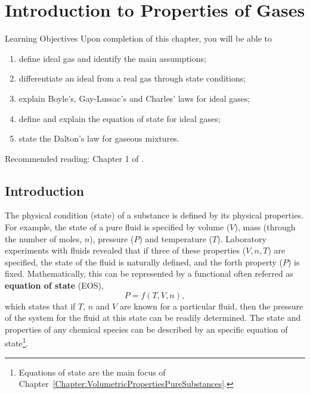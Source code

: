 
\chapter{Introduction to Properties of Gases}\label{Chapter:Intro_Property_of_Gases}

   \begin{LearningObjectivesBlock}{Learning Objectives}
      Upon completion of this chapter, you will be able to
        \begin{enumerate}
           \item define ideal gas and identify the main assumptions;
           \item differentiate an ideal from a real gas through state conditions;
           \item explain Boyle's, Gay-Lussac's and Charles' laws for ideal gases;
           \item define and explain the equation of state for ideal gases;
           \item state the Dalton's law for gaseous mixtures.
        \end{enumerate}
\medskip
     Recommended reading: Chapter 1 of \citet{Atkins_Book,Adamson_BookChapter}.
   \end{LearningObjectivesBlock}


\localtableofcontents
   
     \section{Introduction}\label{Chapter:Intro_Property_of_Gases:Section:Intro}

   The physical condition (\ie state) of a substance is defined by its physical properties. For example, the state of a pure fluid is specified by volume ($V$), mass (through the number of moles, $n$), pressure ($P$) and temperature ($T$). Laboratory experiments with fluids revealed that if three of these properties (\eg $V, n, T$) are specified, the state of the fluid is naturally defined, and the forth property (\ie $P$) is fixed. Mathematically, this can be represented by a functional often referred as {\bf equation of state} (EOS),
     \begin{displaymath}
       P = f(T,V,n),
     \end{displaymath}
     which states that if $T$, $n$ and $V$ are known for a particular fluid, then the pressure of the system for the fluid at this state can be readily determined. The state and properties of any chemical species can be described by an specific equation of state\footnote{Equations of state are the main focus of Chapter~\ref{Chapter:VolumetricPropertiesPureSubstances}.}.
   
